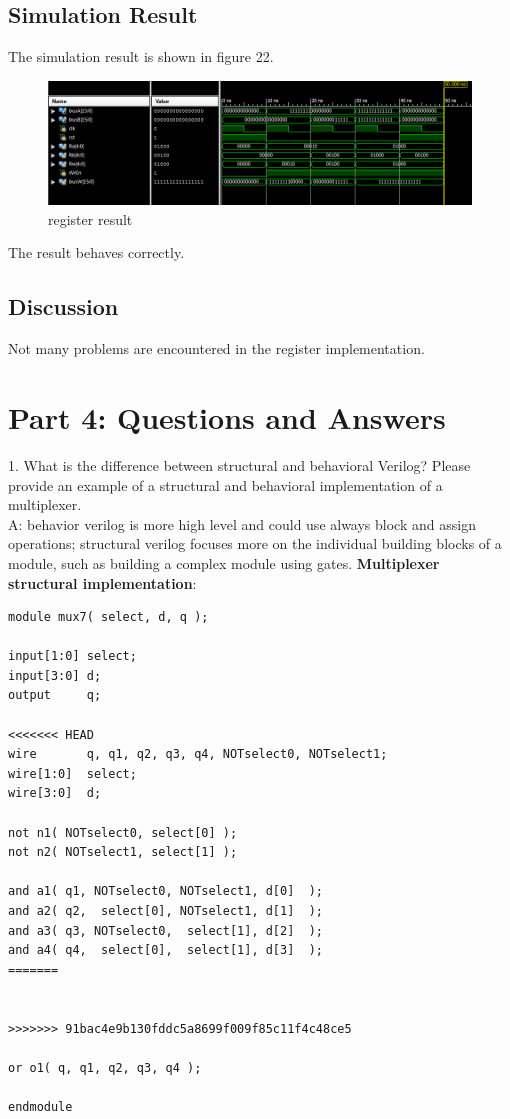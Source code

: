 \documentclass{article}
\begin{document}
\subsection{Simulation Result}
The simulation result is shown in figure 22. 
\begin{figure}[!htb]
  \centering
  \includegraphics[width=\linewidth]{lab1-3.PNG}
  \caption{register result}
  \label{fig:reg_res}
\end{figure}
The result behaves correctly.
\subsection{Discussion}
Not many problems are encountered in the register implementation. 

\section{Part 4: Questions and Answers}
1. What is the difference between structural and behavioral Verilog? Please provide an example of a structural and behavioral implementation of a multiplexer.\\
A: behavior verilog is more high level and could use always block and assign operations; structural verilog focuses more on the individual building blocks of a module, such as building a complex module using gates.  \textbf{Multiplexer structural implementation}: 
\begin{verbatim}
module mux7( select, d, q );

input[1:0] select;
input[3:0] d;
output     q;

<<<<<<< HEAD
wire       q, q1, q2, q3, q4, NOTselect0, NOTselect1;
wire[1:0]  select;
wire[3:0]  d;

not n1( NOTselect0, select[0] );
not n2( NOTselect1, select[1] );

and a1( q1, NOTselect0, NOTselect1, d[0]  );
and a2( q2,  select[0], NOTselect1, d[1]  );
and a3( q3, NOTselect0,  select[1], d[2]  );
and a4( q4,  select[0],  select[1], d[3]  );
=======


>>>>>>> 91bac4e9b130fddc5a8699f009f85c11f4c48ce5

or o1( q, q1, q2, q3, q4 );

endmodule
\end{verbatim}
\end{document}
